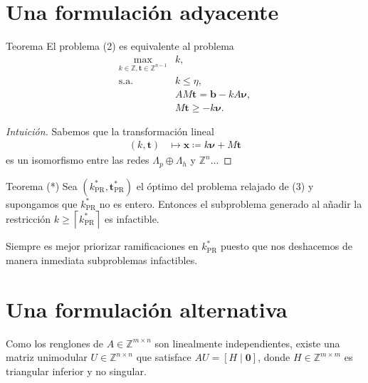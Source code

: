 \documentclass[aspectratio=169,professionalfonts]{beamer}
\newcommand{\Z}{\mathbb{Z}}
\renewcommand{\vec}[1]{\boldsymbol{#1}}
\newcommand{\optr}[1]{#1^*_{\text{PR}}}
\newcommand{\ceil}[1]{\left\lceil #1 \right\rceil}
\begin{document}
\section{Una formulación adyacente}
\begin{frame}
	\begin{block}{Teorema}
		El problema (2) es equivalente al problema
		\begin{subequations}
			\begin{align}
				\max_{k \in \Z, \vec{t} \in \Z^{n-1}}
					& k, \\
				\text{s.a.} \quad
					& k \leq \eta, \\
					& AM\vec{t} = \vec{b} - kA\vec{\nu}, \\
					& M\vec{t} \geq -k\vec{\nu}.
			\end{align}
		\end{subequations}
	\end{block}
	\begin{proof}[Intuición]
		Sabemos que la transformación lineal
		\begin{align*}
			(k, \vec{t}) &\mapsto \vec{x} \coloneq k\vec{\nu} + M\vec{t}
		\end{align*}
		es un isomorfismo entre las redes $\Lambda_p \oplus \Lambda_h$ y $\Z^n$...
	\end{proof}
\end{frame}

\begin{frame}
	\begin{block}{Teorema (*)}
		Sea $(\optr{k}, \optr{\vec{t}})$ el óptimo del problema relajado de
		(3) y supongamos que $\optr{k}$ no es entero.
		Entonces el subproblema generado al añadir la restricción $k \geq
		\ceil{\optr{k}}$ es infactible.
	\end{block}
	Siempre es mejor priorizar ramificaciones en $\optr{k}$ puesto que nos
	deshacemos de manera inmediata subproblemas infactibles.
\end{frame}

\section{Una formulación alternativa}
\begin{frame}
	Como los renglones de $A \in \Z^{m \times n}$ son linealmente
	independientes, existe una matriz unimodular $U \in \Z^{n \times n}$ que
	satisface $AU = [H \mid \vec{0}]$, donde $H \in \Z^{m \times m}$ es
	triangular inferior y no singular.
\end{frame}
\end{document}
